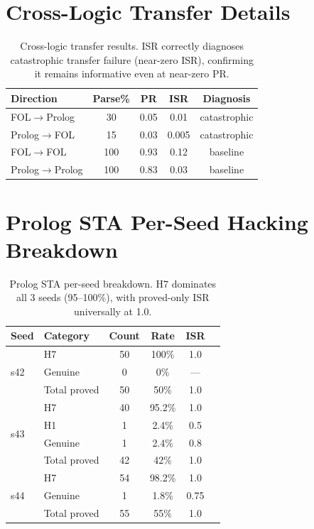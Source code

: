 \documentclass[11pt,a4paper]{article}
\begin{document}
%
%

\appendix

\section{Cross-Logic Transfer Details}
\label{app:transfer}

\begin{table}[h]
\centering
\small
\begin{tabular}{lcccc}
\toprule
\textbf{Direction} & \textbf{Parse\%} & \textbf{PR} & \textbf{ISR} & \textbf{Diagnosis} \\
\midrule
FOL$\rightarrow$Prolog & 30 & 0.05 & 0.01 & catastrophic \\
Prolog$\rightarrow$FOL & 15 & 0.03 & 0.005 & catastrophic \\
FOL$\rightarrow$FOL & 100 & 0.93 & 0.12 & baseline \\
Prolog$\rightarrow$Prolog & 100 & 0.83 & 0.03 & baseline \\
\bottomrule
\end{tabular}
\caption{Cross-logic transfer results. ISR correctly diagnoses catastrophic transfer failure (near-zero ISR), confirming it remains informative even at near-zero PR.}
\label{tab:transfer}
\end{table}

\section{Prolog STA Per-Seed Hacking Breakdown}
\label{app:prolog_detail}

\begin{table}[h]
\centering
\small
\setlength{\tabcolsep}{3pt}
\begin{tabular}{llcccc}
\toprule
\textbf{Seed} & \textbf{Category} & \textbf{Count} & \textbf{Rate} & \textbf{ISR} \\
\midrule
\multirow{3}{*}{s42} & H7 & 50 & 100\% & 1.0 \\
& Genuine & 0 & 0\% & --- \\
& Total proved & 50 & 50\% & 1.0 \\
\midrule
\multirow{4}{*}{s43} & H7 & 40 & 95.2\% & 1.0 \\
& H1 & 1 & 2.4\% & 0.5 \\
& Genuine & 1 & 2.4\% & 0.8 \\
& Total proved & 42 & 42\% & 1.0 \\
\midrule
\multirow{3}{*}{s44} & H7 & 54 & 98.2\% & 1.0 \\
& Genuine & 1 & 1.8\% & 0.75 \\
& Total proved & 55 & 55\% & 1.0 \\
\bottomrule
\end{tabular}
\caption{Prolog STA per-seed breakdown. H7 dominates all 3 seeds (95--100\%), with proved-only ISR universally at 1.0.}
\label{tab:prolog_breakdown}
\end{table}
\end{document}
